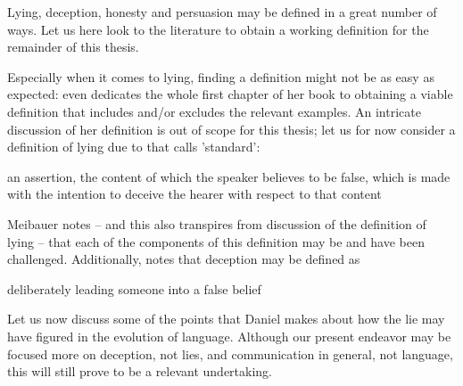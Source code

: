 Lying, deception, honesty and persuasion may be defined in a great number of ways. Let us here look to the literature to obtain a working definition for the remainder of this thesis.

Especially when it comes to lying, finding a definition might not be as easy as expected: \citet{Saul12} even dedicates the whole first chapter of her book to obtaining a viable definition that includes and/or excludes the relevant examples. An intricate discussion of her definition is out of scope for this thesis; let us for now consider a definition of lying due to \citet{Williams02} that \citet{Meibauer18} calls 'standard':
\begin{quoting}
    an assertion, the content of which the speaker believes to be false, which is made with the intention to deceive the hearer with respect to that content
    \hfill \citep[p.~96]{Williams02}
\end{quoting}
Meibauer notes -- and this also transpires from  discussion of the definition of lying -- that each of the components of this definition may be and have been challenged.
Additionally, \citet{Meibauer18} notes that deception may be defined as
\begin{quoting}
    deliberately leading someone into a false belief
    \hfill \citep[.~358]{Meibauer18}
\end{quoting}

Let us now discuss some of the points that Daniel \citet{Dor17} makes about how the lie may have figured in the evolution of language. Although our present endeavor may be focused more on deception, not lies, and communication in general, not language, this will still prove to be a relevant undertaking.


